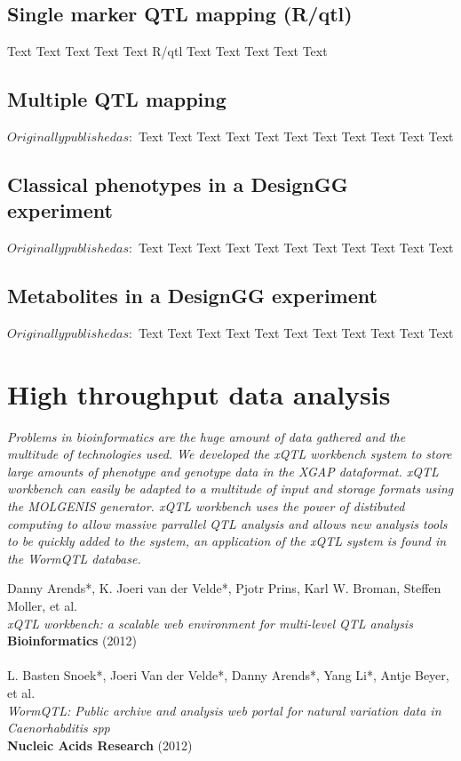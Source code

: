 \documentclass[8pt, twoside, a5paper]{report}
\newenvironment{myexampleblock}[1]{%
    \tcolorbox[beamer,%
    noparskip,breakable,
    colback=LightGreen,colframe=DarkGreen,%
    colbacklower=LimeGreen!75!LightGreen,%
    title=#1]}%
    {\endtcolorbox}
\newcommand{\authors}[1]{\small{#1}}
\newcommand{\bold}[1]{{\bfseries #1}}
\begin{document}
\newpage

\section{Single marker QTL mapping (R/qtl)}
Text Text Text Text Text R/qtl\cite{Broman:2003, Arends:2010} Text Text Text Text Text

\section{Multiple QTL mapping}
$ Originally published as: $
Text Text Text Text Text Text Text Text Text Text Text

\section{Classical phenotypes in a DesignGG experiment}
$Originally published as: $
Text Text Text Text Text Text Text Text Text Text Text

\section{Metabolites in a DesignGG experiment}
$Originally published as: $
Text Text Text Text Text Text Text Text Text Text Text

\chapter{High throughput data analysis}

\emph{Problems in bioinformatics are the huge amount of data gathered and the multitude of technologies used. We 
developed the xQTL workbench system\cite{Arends:2012} to store large amounts of phenotype and genotype data 
in the XGAP\cite{Swertz:2010a} dataformat. xQTL workbench can easily be adapted to a multitude of input and 
storage formats using the MOLGENIS\cite{Swertz:2004} generator. xQTL workbench uses the power of distibuted 
computing to allow massive parrallel QTL analysis and allows new analysis tools to be quickly added to the 
system, an application of the xQTL system is found in the WormQTL database\cite{Snoek:2012}.}

\null
\vfill

\begin{myexampleblock}{Originally published as:}
  \authors{Danny Arends*, K. Joeri van der Velde*, Pjotr Prins, Karl W. Broman, Steffen Moller, et al.}\\
  \emph{xQTL workbench: a scalable web environment for multi-level QTL analysis}\\
  \bold{Bioinformatics} (2012)\\\\

  \authors{L. Basten Snoek*, Joeri Van der Velde*, Danny Arends*, Yang Li*, Antje Beyer, et al.}\\
  \emph{WormQTL: Public archive and analysis web portal for natural variation data in Caenorhabditis spp}\\
  \bold{Nucleic Acids Research} (2012)
\end{myexampleblock}
\end{document}
